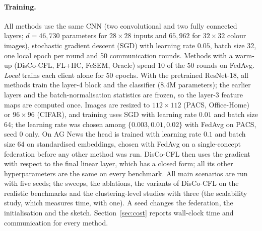 \paragraph{Training.} All methods use the same CNN (two convolutional and two fully connected layers; $d=46{,}730$ parameters for $28\times28$ inputs and $65{,}962$ for $32\times32$ colour images), stochastic gradient descent (SGD) with learning rate $0.05$, batch size 32, one local epoch per round and 50 communication rounds. Methods with a warm-up (DisCo-CFL, FL+HC, FeSEM, Oracle) spend 10 of the 50 rounds on FedAvg. \emph{Local} trains each client alone for 50 epochs. With the pretrained ResNet-18, all methods train the layer-4 block and the classifier (8.4M parameters); the earlier layers and the batch-normalisation statistics are frozen, so the layer-3 feature maps are computed once. Images are resized to $112\times112$ (PACS, Office-Home) or $96\times96$ (CIFAR), and training uses SGD with learning rate $0.01$ and batch size 64; the learning rate was chosen among $\{0.003,0.01,0.02\}$ with FedAvg on PACS, seed 0 only. On AG News the head is trained with learning rate $0.1$ and batch size 64 on standardised embeddings, chosen with FedAvg on a single-concept federation before any other method was run. DisCo-CFL then uses the gradient with respect to the final linear layer, which has a closed form; all its other hyperparameters are the same on every benchmark. All main scenarios are run with five seeds; the sweeps, the ablations, the variants of DisCo-CFL on the realistic benchmarks and the clustering-level studies with three (the scalability study, which measures time, with one). A seed changes the federation, the initialisation and the sketch. Section~\ref{sec:cost} reports wall-clock time and communication for every method.

